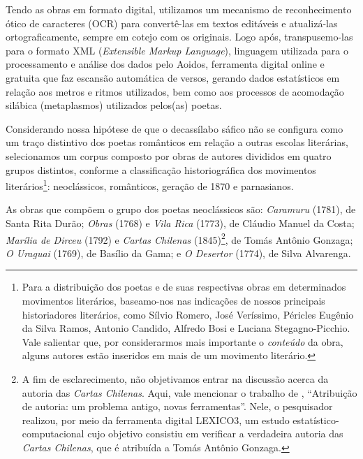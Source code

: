 \documentclass[portuguese]{textolivre}
\begin{document}
Tendo as obras em formato digital, utilizamos um mecanismo de reconhecimento ótico de caracteres (OCR) para convertê-las em textos editáveis e atualizá-las ortograficamente, sempre em cotejo com os originais. Logo após, transpusemo-las para o formato XML (\textit{Extensible Markup Language}), linguagem utilizada para o processamento e análise dos dados pelo Aoidos, ferramenta digital online e gratuita que faz escansão automática de versos, gerando dados estatísticos em relação aos metros e ritmos utilizados, bem como aos processos de acomodação silábica (metaplasmos) utilizados pelos(as) poetas.

Considerando nossa hipótese de que o decassílabo sáfico não se configura como um traço distintivo dos poetas românticos em relação a outras escolas literárias, selecionamos um corpus composto por obras de autores divididos em quatro grupos distintos, conforme a classificação historiográfica dos movimentos literários\footnote{Para a distribuição dos poetas e de suas respectivas obras em determinados movimentos literários, baseamo-nos nas indicações de nossos principais historiadores literários, como Sílvio Romero, José Veríssimo, Péricles Eugênio da Silva Ramos, Antonio Candido, Alfredo Bosi e Luciana Stegagno-Picchio. Vale salientar que, por considerarmos mais importante o \textit{conteúdo} da obra, alguns autores estão inseridos em mais de um movimento literário.}: neoclássicos, românticos, geração de 1870 e parnasianos.

As obras que compõem o grupo dos poetas neoclássicos são: \textit{Caramuru} (1781), de Santa Rita Durão; \textit{Obras} (1768) e \textit{Vila Rica} (1773), de Cláudio Manuel da Costa; \textit{Marília de Dirceu} (1792) e \textit{Cartas Chilenas} (1845)\footnote{A fim de esclarecimento, não objetivamos entrar na discussão acerca da autoria das \textit{Cartas Chilenas}. Aqui, vale mencionar o trabalho de \textcite{brandao2006atribuicao}, “Atribuição de autoria: um problema antigo, novas ferramentas”. Nele, o pesquisador realizou, por meio da ferramenta digital LEXICO3, um estudo estatístico-computacional cujo objetivo consistiu em verificar a verdadeira autoria das \textit{Cartas Chilenas}, que é atribuída a Tomás Antônio Gonzaga.}, de Tomás Antônio Gonzaga; \textit{O Uraguai} (1769), de Basílio da Gama; e \textit{O Desertor} (1774), de Silva Alvarenga.
\end{document}
